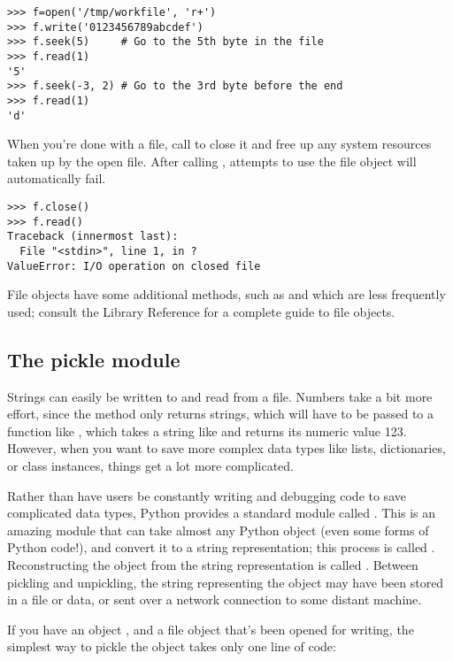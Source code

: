 \bcode\begin{verbatim}
>>> f=open('/tmp/workfile', 'r+')
>>> f.write('0123456789abcdef')
>>> f.seek(5)     # Go to the 5th byte in the file
>>> f.read(1)        
'5'
>>> f.seek(-3, 2) # Go to the 3rd byte before the end
>>> f.read(1)
'd'
\end{verbatim}\ecode
%
When you're done with a file, call  to close it and
free up any system resources taken up by the open file.  After calling
, attempts to use the file object will automatically fail.

\bcode\begin{verbatim}
>>> f.close()
>>> f.read()
Traceback (innermost last):
  File "<stdin>", line 1, in ?
ValueError: I/O operation on closed file
\end{verbatim}\ecode
%
File objects have some additional methods, such as  and
 which are less frequently used; consult the Library
Reference for a complete guide to file objects.

\subsection{The pickle module}

Strings can easily be written to and read from a file. Numbers take a
bit more effort, since the  method only returns strings,
which will have to be passed to a function like ,
which takes a string like  and returns its numeric value
123.  However, when you want to save more complex data types like
lists, dictionaries, or class instances, things get a lot more
complicated.  

Rather than have users be constantly writing and debugging code to
save complicated data types, Python provides a standard module called
.  This is an amazing module that can take almost
any Python object (even some forms of Python code!), and convert it to
a string representation; this process is called .  
Reconstructing the object from the string representation is called
.  Between pickling and unpickling, the string
representing the object may have been stored in a file or data, or
sent over a network connection to some distant machine.

If you have an object , and a file object  that's been
opened for writing, the simplest way to pickle the object takes only
one line of code:

